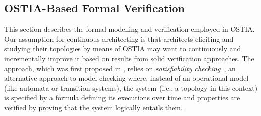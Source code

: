 %
\subsection{OSTIA-Based Formal Verification}\label{ver}


This section describes the formal modelling and verification employed in OSTIA. Our assumption for continuous architecting is that architects eliciting and studying their topologies by means of OSTIA may want to continuously and incrementally improve it based on results from solid verification approaches. The approach, which was first proposed in \cite{MBER16}, relies on \textit{satisfiability checking}~\cite{MPS13}, an alternative approach to model-checking where, instead of an operational model (like automata or transition systems), the system (i.e., a topology in this context) is specified by a formula defining its executions over time and properties are verified by proving that the system logically entails them.

